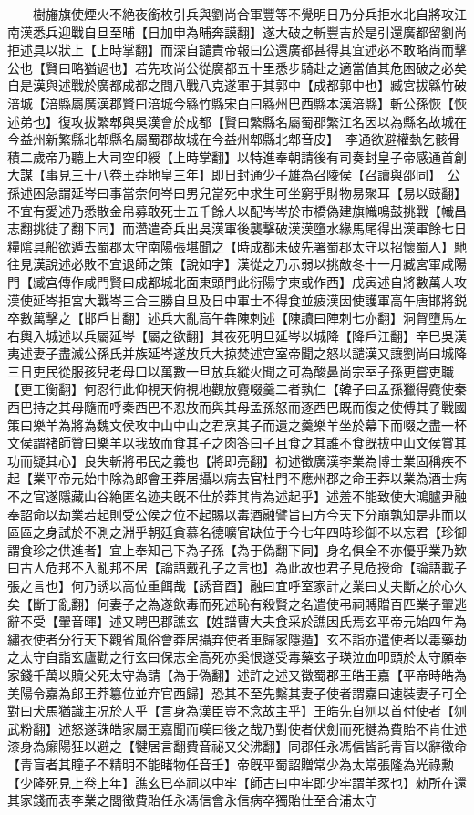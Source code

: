 　　樹旛旗使煙火不絶夜銜枚引兵與劉尚合軍豐等不覺明日乃分兵拒水北自將攻江南漢悉兵迎戰自旦至晡【日加申為晡奔謨翻】遂大破之斬豐吉於是引還廣都留劉尚拒述具以狀上【上時掌翻】而深自譴責帝報曰公還廣都甚得其宜述必不敢略尚而擊公也【賢曰略猶過也】若先攻尚公從廣都五十里悉步騎赴之適當值其危困破之必矣自是漢與述戰於廣都成都之間八戰八克遂軍于其郭中【成都郭中也】臧宮拔緜竹破涪城【涪縣屬廣漢郡賢曰涪城今緜竹縣宋白曰緜州巴西縣本漢涪縣】斬公孫恢【恢述弟也】復攻拔繁郫與吳漢會於成都【賢曰繁縣名屬蜀郡繁江名因以為縣名故城在今益州新繁縣北郫縣名屬蜀郡故城在今益州郫縣北郫音皮】　李通欲避權埶乞骸骨積二歲帝乃聽上大司空印綬【上時掌翻】以特進奉朝請後有司奏封皇子帝感通首創大謀【事見三十八卷王莽地皇三年】即日封通少子雄為召陵侯【召讀與邵同】　公孫述困急謂延岑曰事當奈何岑曰男兒當死中求生可坐窮乎財物易聚耳【易以豉翻】不宜有愛述乃悉散金帛募敢死士五千餘人以配岑岑於市橋偽建旗幟鳴鼓挑戰【幟昌志翻挑徒了翻下同】而濳遣奇兵出吳漢軍後襲擊破漢漢墮水緣馬尾得出漢軍餘七日糧隂具船欲遁去蜀郡太守南陽張堪聞之【時成都未破先署蜀郡太守以招懷蜀人】馳往見漢說述必敗不宜退師之策【說如字】漢從之乃示弱以挑敵冬十一月臧宮軍咸陽門【臧宫傳作咸門賢曰成都城北面東頭門此衍陽字東或作西】戊寅述自將數萬人攻漢使延岑拒宮大戰岑三合三勝自旦及日中軍士不得食並疲漢因使護軍高午唐邯將鋭卒數萬擊之【邯戶甘翻】述兵大亂高午犇陳刺述【陳讀曰陣刺七亦翻】洞胷墮馬左右輿入城述以兵屬延岑【屬之欲翻】其夜死明旦延岑以城降【降戶江翻】辛巳吳漢夷述妻子盡滅公孫氏并族延岑遂放兵大掠焚述宫室帝聞之怒以譴漢又讓劉尚曰城降三日吏民從服孩兒老母口以萬數一旦放兵縱火聞之可為酸鼻尚宗室子孫更嘗吏職【更工衡翻】何忍行此仰視天俯視地觀放麑啜羹二者孰仁【韓子曰孟孫獵得麑使秦西巴持之其母隨而呼秦西巴不忍放而與其母孟孫怒而逐西巴既而復之使傅其子戰國策曰樂羊為將為魏文侯攻中山中山之君烹其子而遺之羹樂羊坐於幕下而啜之盡一杯文侯謂禇師贊曰樂羊以我故而食其子之肉答曰子且食之其誰不食旣拔中山文侯賞其功而疑其心】良失斬將弔民之義也【將即亮翻】初述徵廣漢李業為博士業固稱疾不起【業平帝元始中除為郎會王莽居攝以病去官杜門不應州郡之命王莽以業為酒士病不之官遂隱藏山谷絶匿名迹夫旣不仕於莽其肯為述起乎】述羞不能致使大鴻臚尹融奉詔命以劫業若起則受公侯之位不起賜以毒酒融譬旨曰方今天下分崩孰知是非而以區區之身試於不測之淵乎朝廷貪慕名德曠官缺位于今七年四時珍御不以忘君【珍御謂食珍之供進者】宜上奉知己下為子孫【為于偽翻下同】身名俱全不亦優乎業乃歎曰古人危邦不入亂邦不居【論語戴孔子之言也】為此故也君子見危授命【論語載子張之言也】何乃誘以高位重餌哉【誘音酉】融曰宜呼室家計之業曰丈夫斷之於心久矣【斷丁亂翻】何妻子之為遂飲毒而死述恥有殺賢之名遣使弔祠賻贈百匹業子翬逃辭不受【翬音暉】述又聘巴郡譙玄【姓譜曹大夫食采於譙因氏焉玄平帝元始四年為繡衣使者分行天下觀省風俗會莽居攝弃使者車歸家隱遁】玄不詣亦遣使者以毒藥劫之太守自詣玄廬勸之行玄曰保志全高死亦奚恨遂受毒藥玄子瑛泣血叩頭於太守願奉家錢千萬以贖父死太守為請【為于偽翻】述許之述又徵蜀郡王皓王嘉【平帝時皓為美陽令嘉為郎王莽簒位並弃官西歸】恐其不至先繫其妻子使者謂嘉曰速裝妻子可全對曰犬馬猶識主况於人乎【言身為漢臣豈不念故主乎】王皓先自刎以首付使者【刎武粉翻】述怒遂誅皓家屬王嘉聞而嘆曰後之哉乃對使者伏劍而死犍為費貽不肯仕述漆身為癩陽狂以避之【犍居言翻費音祕又父沸翻】同郡任永馮信皆託青盲以辭徵命【青盲者其瞳子不精明不能睹物任音壬】帝旣平蜀詔贈常少為太常張隆為光祿勲【少隆死見上卷上年】譙玄已卒祠以中牢【師古曰中牢即少牢謂羊豕也】勑所在還其家錢而表李業之閭徵費貽任永馮信會永信病卒獨貽仕至合浦太守
